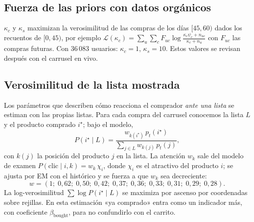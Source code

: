 \documentclass[11pt,a4paper]{article}
\begin{document}
\subsection{Fuerza de las priors con datos orgánicos}

$\kappa_c$ y $\kappa_s$ maximizan la verosimilitud de las compras de los días $[45,60)$ dados los
recuentos de $[0,45)$, por ejemplo
$\mathcal L(\kappa_c)=\sum_u\sum_c F_{uc}\log\frac{\kappa_c\psi_c+n_{uc}}{\kappa_c+n_u}$ con $F_{uc}$ las compras
futuras. Con $36\,083$ usuarios: $\kappa_c=1$, $\kappa_s=10$. Estos valores se revisan después con el
carrusel en vivo.

\subsection{Verosimilitud de la lista mostrada}\label{sec:lista}

Los parámetros que describen cómo reacciona el comprador \emph{ante una lista} se estiman con las
propias listas. Para cada compra del carrusel conocemos la lista $L$ y el producto comprado $i^\star$; bajo
el modelo,
\begin{equation}
P(i^\star\mid L)=\frac{w_{k(i^\star)}\,p_t(i^\star)}{\sum_{j\in L}w_{k(j)}\,p_t(j)}, \label{eq:lista}
\end{equation}
con $k(j)$ la posición del producto $j$ en la lista. La atención $w_k$ sale del modelo de examen
$P(\text{clic}\mid i,k)=w_k\,\chi_i$, donde $\chi_i$ es el atractivo del producto $i$; se ajusta por EM con
el histórico y se fuerza a que $w_k$ sea decreciente:
\[
w=(1;\;0{,}62;\;0{,}50;\;0{,}42;\;0{,}37;\;0{,}36;\;0{,}33;\;0{,}31;\;0{,}29;\;0{,}28).
\]
La log-verosimilitud
$\sum\log P(i^\star\mid L)$ se maximiza por ascenso por coordenadas sobre rejillas. En esta estimación «ya
comprado» entra como un indicador más, con coeficiente $\beta_{\text{bought}}$, para no confundirlo
con el carrito.
\end{document}
